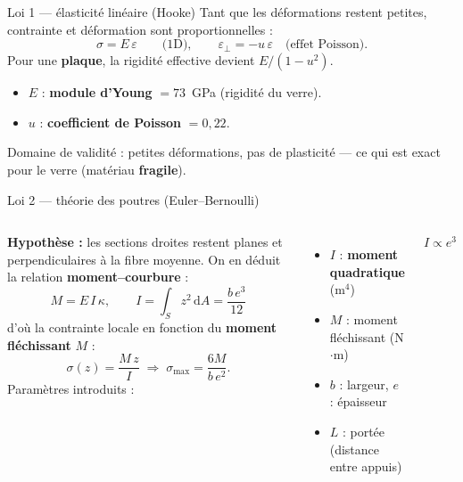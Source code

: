 \documentclass[11pt,aspectratio=169]{beamer}
\begin{document}
\begin{frame}{Loi 1 --- élasticité linéaire (Hooke)}
  \footnotesize
  Tant que les déformations restent petites, contrainte et déformation sont
  proportionnelles :
  \[ \sigma = E\,\varepsilon \qquad\text{(1D)},\qquad
     \varepsilon_{\!\perp} = -
u\,\varepsilon \quad\text{(effet Poisson)}. \]
  Pour une \textbf{plaque}, la rigidité effective devient $E/(1-
u^{2})$.
  \begin{itemize}
    \item $E$ : \textbf{module d'Young} $=73$~GPa (rigidité du verre).
    \item $
u$ : \textbf{coefficient de Poisson} $=0{,}22$.
  \end{itemize}
  \centering\textcolor{danger}{Domaine de validité : petites déformations, pas de
  plasticité --- ce qui est exact pour le verre (matériau \textbf{fragile}).}
\end{frame}

\begin{frame}{Loi 2 --- théorie des poutres (Euler--Bernoulli)}
  \begin{columns}[c]
    \footnotesize
    \textbf{Hypothèse :} les sections droites restent planes et perpendiculaires
    à la fibre moyenne. On en déduit la relation \textbf{moment--courbure} :
    \[ M = E\,I\,\kappa,\qquad
       I=\int_{S} z^{2}\,\mathrm{d}A=\frac{b\,e^{3}}{12} \]
    d'où la contrainte locale en fonction du \textbf{moment fléchissant} $M$ :
    \[ \sigma(z)=\frac{M\,z}{I}\;\Rightarrow\;
       \sigma_{\max}=\frac{6M}{b\,e^{2}}. \]
    \scriptsize
    Paramètres introduits :
    \begin{itemize}
      \item $I$ : \textbf{moment quadratique} (m$^4$)
      \item $M$ : moment fléchissant (N$\cdot$m)
      \item $b$ : largeur, $e$ : épaisseur
      \item $L$ : portée (distance entre appuis)
    \end{itemize}
    \centering\vspace{4pt}
    \textbf{\textcolor{verre}{$I\propto e^{3}$}}
  \end{columns}
\end{frame}
\end{document}
